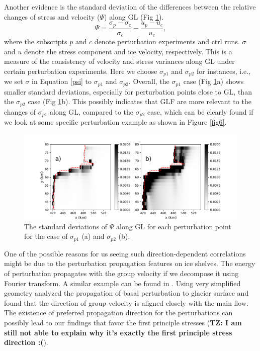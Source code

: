 \documentclass[review,oneside]{igs}
\begin{document}
Another evidence is the standard deviation of the differences between the relative changes of stress and velocity ($\Psi$) along GL (Fig \ref{fig5}). 
\begin{equation}
\Psi = \frac{\sigma_{p}-\sigma_{c}}{\sigma_{c}} - \frac{u_{p}-u_{c}}{u_{c}},
\label{psi}
\end{equation}
where the subscripts $p$ and $c$ denote perturbation experiments and ctrl runs. $\sigma$ and $u$ denote the stress component and ice velocity, respectively. This is a measure of the consistency of velocity and stress variances along GL under certain perturbation experiments. Here we choose $\sigma_{p1}$ and $\sigma_{p2}$ for instances, i.e., we set $\sigma$ in Equation \ref{psi} to $\sigma_{p1}$ and $\sigma_{p2}$. Overall, the $\sigma_{p1}$ case (Fig \ref{fig5}a) shows smaller standard deviations, especially for perturbation points close to GL, than the $\sigma_{p2}$ case (Fig \ref{fig5}b). This possibly indicates that GLF are more relevant to the changes of $\sigma_{p1}$ along GL, compared to the $\sigma_{p2}$ case, which can be clearly found if we look at some specific perturbation example as shown in Figure \ref{fig6}. 

\begin{figure}
	\centering
    \includegraphics[width=1\linewidth]{figs/fig5.pdf}
    \caption{The standard deviations of $\Psi$ along GL for each perturbation point for the case of $\sigma_{p1}$ (a) and $\sigma_{p2}$ (b).}
	\label{fig5}
\end{figure}

One of the possible reasons for us seeing such direction-dependent correlations might be due to the perturbation propagation features on ice shelves. The energy of perturbation propagates with the group velocity if we decompose it using Fourier transform. A similar example can be found in \citep{gudmundsson2003}. Using very simplified geometry \cite{gudmundsson2003} analyzed the propagation of basal perturbation to glacier surface and found that the direction of group velocity is aligned closely with the main flow. The existence of preferred propagation direction for the perturbations can possibly lead to our findings that favor the first principle stresses ({\bf{TZ: I am still not able to explain why it's exactly the first principle stress direction :(}}). 
\end{document}
